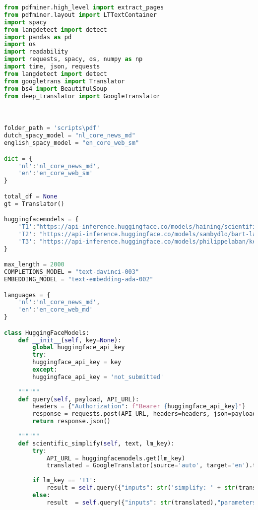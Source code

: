 \newpage

\begin{center}
	\begin{lstlisting}[language=Python, caption={Script voor de derde fase van de vergelijkende studie}, label={code:verg-studie-phase-3}]
from pdfminer.high_level import extract_pages
from pdfminer.layout import LTTextContainer
import spacy
from langdetect import detect
import pandas as pd
import os
import readability
import requests, spacy, os, numpy as np
import time, json, requests
from langdetect import detect
from googletrans import Translator
from bs4 import BeautifulSoup
from deep_translator import GoogleTranslator



folder_path = 'scripts\pdf'
dutch_spacy_model = "nl_core_news_md"
english_spacy_model = "en_core_web_sm"

dict = {
	'nl':'nl_core_news_md',
	'en':'en_core_web_sm'
}

total_df = None
gt = Translator()

huggingfacemodels = {
	'T1':"https://api-inference.huggingface.co/models/haining/scientific_abstract_simplification",
	'T2': "https://api-inference.huggingface.co/models/sambydlo/bart-large-scientific-lay-summarisation",
	'T3': "https://api-inference.huggingface.co/models/philippelaban/keep_it_simple"
}

max_length = 2000
COMPLETIONS_MODEL = "text-davinci-003"
EMBEDDING_MODEL = "text-embedding-ada-002"

languages = {
	'nl':'nl_core_news_md',
	'en':'en_core_web_md'
}

class HuggingFaceModels:
	def __init__(self, key=None):
		global huggingface_api_key
		try:
		huggingface_api_key = key
		except:
		huggingface_api_key = 'not_submitted'
	
	""""""
	def query(self, payload, API_URL):
		headers = {"Authorization": f"Bearer {huggingface_api_key}"}
		response = requests.post(API_URL, headers=headers, json=payload)
		return response.json()
	
	""""""
	def scientific_simplify(self, text, lm_key):
		try:
			API_URL = huggingfacemodels.get(lm_key)
			translated = GoogleTranslator(source='auto', target='en').translate(str(text))
		
		if lm_key == 'T1':
			result = self.query({"inputs": str('simplify: ' + str(translated)),"parameters": {"max_length": len(sentence)+10},"options":{"wait_for_model":True}}, API_URL)
		else:
			result  = self.query({"inputs": str(translated),"parameters": {"max_length": len(sentence)+10},"options":{"wait_for_model":True}}, API_URL)
		

\end{lstlisting}
\end{center}
